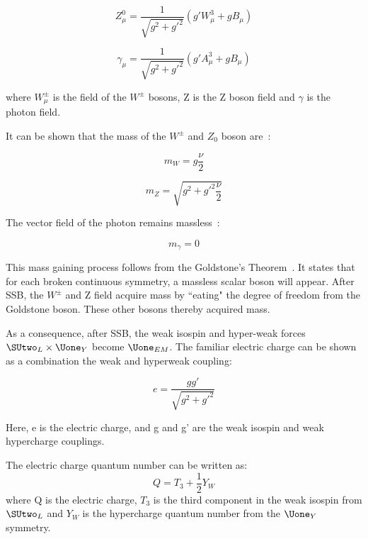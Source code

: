 {\begin{equation}
    Z^{0}_{\mu}=\frac{1}{\sqrt{g^{2}+g'^{2}}}(g'W_{\mu}^{3} + gB_{\mu})
\end{equation}

\begin{equation}
    \gamma_{\mu} = \frac{1}{\sqrt{g^{2}+g'^{2}}}(g'A^{3}_{\mu} + g B_{\mu})
\end{equation}

where $W^{\pm}_{\mu}$ is the field of the $W^{\pm}$ bosons, Z is the Z boson field and $\gamma$ is the photon field. 

It can be shown that the mass of the $W^{\pm}$ and $Z_{0}$ boson are~\cite{peskin2018introduction}:

\begin{equation}
    m_{W} = g \frac{\nu}{2}
\end{equation}

\begin{equation}
    m_{Z} = \sqrt{g^{2}+ g'^{2}\frac{\nu}{2}}
\end{equation}

The vector field of the photon remains massless~\cite{peskin2018introduction}: 

\begin{equation}
    m_{\gamma}=0
\end{equation}


This mass gaining process follows from the Goldstone's Theorem~\cite{PhysRev.117.648}. It states that for each broken continuous symmetry, a massless scalar boson will appear. After SSB, the $W^{\pm}$ and Z field acquire mass by ``eating" the degree of freedom from the Goldstone boson. These other bosons thereby acquired mass. 

As a consequence, after SSB, the weak isospin and hyper-weak forces $\SUtwo_{L} \times \Uone_{Y}$ become $\Uone_{EM}$. The familiar electric charge can be shown as a combination the weak and hyperweak coupling:

\begin{equation}
    e= \frac{g g'}{\sqrt{g^{2}+g'^{2}}}
\end{equation}

Here, e is the electric charge, and g and g' are the weak isospin and weak hypercharge couplings. 

The electric charge quantum number can be written as:
\begin{equation}
    Q=T_{3}+\frac{1}{2}Y_{W}
\end{equation}
where Q is the electric charge, $T_{3}$ is the third component in the weak isospin from $\SUtwo_{L}$ and $Y_{W}$ is the hypercharge quantum number from the $\Uone_{Y}$ symmetry. 

}
